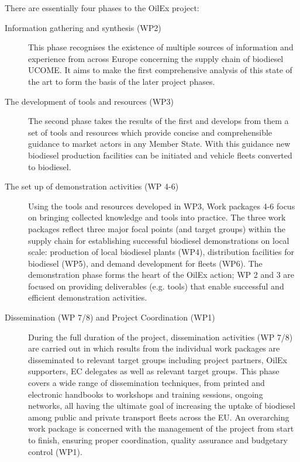 \documentclass[11pt,fleqn]{book} %
\begin{document}
There are essentially four phases to the OilEx project:
\begin{description}
	\item[Information gathering and synthesis (WP2)] This phase recognises the existence of multiple sources of information and experience from
    across Europe concerning the supply chain of biodiesel UCOME. It aims to make the first
    comprehensive analysis of this state of the art to form the basis of the later project phases.    
	\item[The development of tools and resources (WP3)] The second phase takes the results of the first and develops from them a set of tools and
    resources which provide concise and comprehensible guidance to market actors in any
    Member State. With this guidance new biodiesel production facilities can be initiated and
    vehicle fleets converted to biodiesel.    
    \item[The set up of demonstration activities (WP 4-6)] Using the tools and resources developed in WP3, Work packages 4-6 focus on bringing
    collected knowledge and tools into practice. The three work packages reflect three major
    focal points (and target groups) within the supply chain for establishing successful biodiesel
    demonstrations on local scale: production of local biodiesel plants (WP4), distribution
    facilities for biodiesel (WP5), and demand development for fleets (WP6). The demonstration
    phase forms the heart of the OilEx action; WP 2 and 3 are focused on providing
    deliverables (e.g. tools) that enable successful and efficient demonstration activities.    
    \item[Dissemination (WP 7/8) and Project Coordination (WP1)] During the full duration of the project, dissemination activities (WP 7/8) are carried out in
    which results from the individual work packages are disseminated to relevant target groups
    including project partners, OilEx supporters, EC delegates as well as relevant target
    groups. This phase covers a wide range of dissemination techniques, from printed and
    electronic handbooks to workshops and training sessions, ongoing networks, all having the
    ultimate goal of increasing the uptake of biodiesel among public and private transport fleets
    across the EU. An overarching work package is concerned with the management of the
    project from start to finish, ensuring proper coordination, quality assurance and budgetary
    control (WP1).
\end{description}
\end{document}
